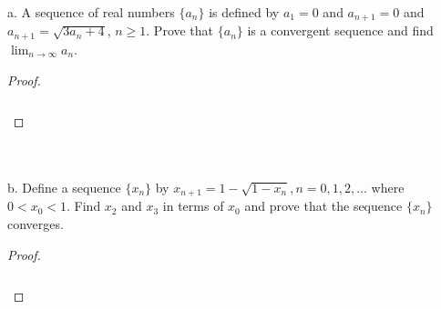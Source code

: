 a.  A sequence of real numbers $\{a_n\}$ is defined by $a_1 = 0$ and
    $a_{n+1} = 0$ and $a_{n+1} = \sqrt{3a_n + 4}$, $n \ge 1$. Prove that
    $\{a_n\}$ is a convergent sequence and find
    $\lim_{n \rightarrow \infty}{a_n}$.

    \begin{proof}\ \\\\
    
        \begin{align*}
        \end{align*}
    \end{proof}
    \ \\\\

b.  Define a sequence 
    $\{x_n\}$ by $x_{n+1} = 1 - \sqrt{1 - x_n}, n = 0, 1, 2, \ldots$ where
    $0 < x_0 < 1$. Find $x_2$ and $x_3$ in terms of $x_0$ and prove that the
    sequence $\{x_n\}$ converges.
\\

    \begin{proof}\ \\\\

        \begin{align*}
        \end{align*}

    \end{proof}